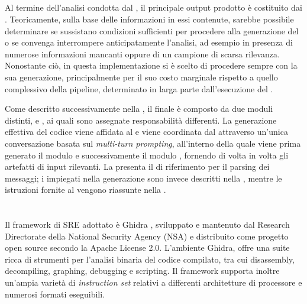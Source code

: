 
\subsection{\codeagent{}} %

Al termine dell'analisi condotta dal \sreagent{}, il principale output prodotto è costituito dai \report{}. Teoricamente, sulla base delle informazioni in essi contenute, sarebbe possibile determinare se sussistano condizioni sufficienti per procedere alla generazione del \capture{} o se convenga interrompere anticipatamente l'analisi, ad esempio in presenza di numerose informazioni mancanti oppure di un campione di scarsa rilevanza. Nonostante ciò, in questa implementazione si è scelto di procedere sempre con la sua generazione, principalmente per il suo costo marginale rispetto a quello complessivo della pipeline, determinato in larga parte dall'esecuzione del \sreagent{}.

Come descritto successivamente nella , il \capture{} finale è composto da due moduli distinti, \botnet{} e \parser{}, ai quali sono assegnate responsabilità differenti. La generazione effettiva del codice viene affidata al \llm{} e viene coordinata dal \codeagent{} attraverso un'unica conversazione basata sul \emph{multi-turn prompting}, all'interno della quale viene prima generato il modulo \botnet{} e successivamente il modulo \parser{}, fornendo di volta in volta gli artefatti di input rilevanti. La  presenta il \schema{} di riferimento per il parsing dei messaggi; i \templates{} impiegati nella generazione sono invece descritti nella , mentre le istruzioni fornite al \codeagent{} vengono riassunte nella .

\section{\sreframework{}} \label{sec:ghidra} %

Il framework di SRE adottato è Ghidra \cite{nsa2026docs}, sviluppato e mantenuto dal Research Directorate della National Security Agency (NSA) e distribuito come progetto open source secondo la Apache License 2.0. L'ambiente Ghidra, offre una suite ricca di strumenti per l'analisi binaria del codice compilato, tra cui disassembly, decompiling, graphing, debugging e scripting. Il framework supporta inoltre un'ampia varietà di \emph{instruction set} relativi a differenti architetture di processore e numerosi formati eseguibili.

